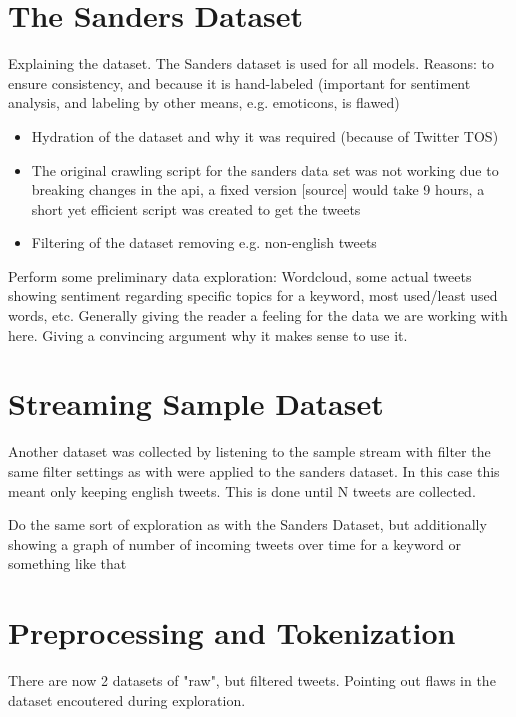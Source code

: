 \section{The Sanders Dataset}
\label{sec:theSandersDataset}

Explaining the dataset.
The Sanders dataset is used for all models.
Reasons: to ensure consistency, and because it is hand-labeled (important for sentiment analysis, and labeling by other means, e.g. emoticons, is flawed)

\begin{itemize}
    \item
    Hydration of the dataset and why it was required (because of Twitter TOS)
    \item
    The original crawling script for the sanders data set was not working due to breaking changes in the api, a fixed version [source] would take 9 hours, a short yet efficient script was created to get the tweets
    \item
    Filtering of the dataset removing e.g. non-english tweets
\end{itemize}

Perform some preliminary data exploration: Wordcloud, some actual tweets showing sentiment regarding specific topics for a keyword, most used/least used words, etc.
Generally giving the reader a feeling for the data we are working with here.
Giving a convincing argument why it makes sense to use it.

\section{Streaming Sample Dataset}
\label{sec:streamingSampleDataset}

Another dataset was collected by listening to the sample stream with filter the same filter settings as with were applied to the sanders dataset.
In this case this meant only keeping english tweets.
This is done until N tweets are collected.

Do the same sort of exploration as with the Sanders Dataset, but additionally showing a graph of number of incoming tweets over time for a keyword or something like that

\section{Preprocessing and Tokenization}
\label{sec:preprocessingAndTokenization}

There are now 2 datasets of "raw", but filtered tweets.
Pointing out flaws in the dataset encoutered during exploration.

